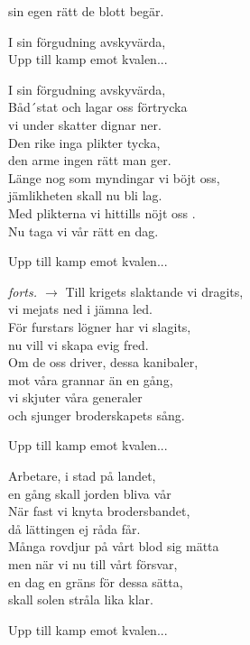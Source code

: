 sin egen rätt de blott begär.\par
\vspace{10pt}
I sin förgudning avskyvärda,\\
Upp till kamp emot kvalen...\par
\vspace{10pt}
I sin förgudning avskyvärda,\\
Båd´stat och lagar oss förtrycka\\
vi under skatter dignar ner.\\
Den rike inga plikter tycka,\\
den arme ingen rätt man ger.\\
Länge nog som myndingar vi böjt oss,\\
jämlikheten skall nu bli lag.\\
Med plikterna vi hittills nöjt oss .\\
Nu taga vi vår rätt en dag.\par
\vspace{10pt}
Upp till kamp emot kvalen...\par
\vfill
\hfill {\footnotesize\textit{forts. $\rightarrow$}}
\newpage
Till krigets slaktande vi dragits,\\
vi mejats ned i jämna led.\\
För furstars lögner har vi slagits,\\
nu vill vi skapa evig fred.\\
Om de oss driver, dessa kanibaler,\\
mot våra grannar än en gång,\\
vi skjuter våra generaler\\
och sjunger broderskapets sång.\par
\vspace{10pt}
Upp till kamp emot kvalen...\par
\vspace{10pt}
Arbetare, i stad på landet,\\
en gång skall jorden bliva vår\\
När fast vi knyta brodersbandet,\\
då lättingen ej råda får.\\
Många rovdjur på vårt blod sig mätta\\
men när vi nu till vårt försvar,\\
en dag en gräns för dessa sätta,\\
skall solen stråla lika klar.\par
\vspace{10pt}
Upp till kamp emot kvalen...
